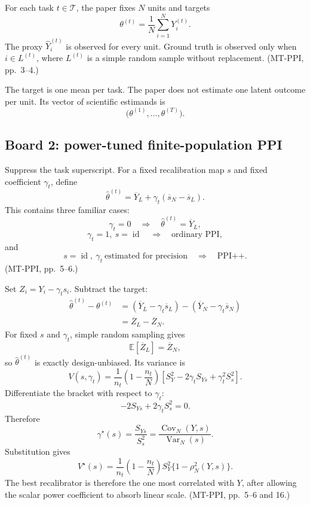 \documentclass[11pt]{article}
\newcommand{\E}{\mathbb{E}}
\newcommand{\Var}{\operatorname{Var}}
\newcommand{\Cov}{\operatorname{Cov}}
\begin{document}
  For each task \(t\in\mathcal T\), the paper fixes \(N\) units and targets
  \[
      \theta^{(t)}
      =
      \frac{1}{N}\sum_{i=1}^NY_i^{(t)}.
  \]
  The proxy \(\widehat Y_i^{(t)}\) is observed for every unit. Ground truth is
  observed only when \(i\in L^{(t)}\), where \(L^{(t)}\) is a simple random sample
  without replacement. (MT-PPI, pp.~3--4.)
  
  The target is one mean per task. The paper does not estimate one latent outcome
  per unit. Its vector of scientific estimands is
  \[
      \bigl(\theta^{(1)},\ldots,\theta^{(T)}\bigr).
  \]
  
  \subsection*{Board 2: power-tuned finite-population PPI}
  
  Suppress the task superscript. For a fixed recalibration map \(s\) and fixed
  coefficient \(\gamma_t\), define
  \[
      \widehat\theta^{(t)}
      =
      \overline Y_L+\gamma_t(\overline s_N-\overline s_L).
  \]
  This contains three familiar cases:
  \[
      \gamma_t=0
      \quad\Rightarrow\quad
      \widehat\theta^{(t)}=\overline Y_L,
  \]
  \[
      \gamma_t=1,\ s=\operatorname{id}
      \quad\Rightarrow\quad
      \text{ordinary PPI},
  \]
  and
  \[
      s=\operatorname{id},\ \gamma_t\ \text{estimated for precision}
      \quad\Rightarrow\quad
      \text{PPI++}.
  \]
  (MT-PPI, pp.~5--6.)
  
  Set \(Z_i=Y_i-\gamma_t s_i\). Subtract the target:
  \begin{align*}
      \widehat\theta^{(t)}-\theta^{(t)}
      &=
      (\overline Y_L-\gamma_t\overline s_L)
      -
      (\overline Y_N-\gamma_t\overline s_N)\\
      &=\overline Z_L-\overline Z_N.
  \end{align*}
  For fixed \(s\) and \(\gamma_t\), simple random sampling gives
  \[
      \E[\overline Z_L]=\overline Z_N,
  \]
  so \(\widehat\theta^{(t)}\) is exactly design-unbiased. Its variance is
  \[
      V(s,\gamma_t)
      =
      \frac{1}{n_t}
      \left(1-\frac{n_t}{N}\right)
      \left[
        S_Y^2-2\gamma_tS_{Ys}
        +\gamma_t^2S_s^2
      \right].
  \]
  Differentiate the bracket with respect to \(\gamma_t\):
  \[
      -2S_{Ys}+2\gamma_tS_s^2=0.
  \]
  Therefore
  \[
      \gamma^\star(s)
      =
      \frac{S_{Ys}}{S_s^2}
      =
      \frac{\Cov_N(Y,s)}{\Var_N(s)}.
  \]
  Substitution gives
  \[
      V^\star(s)
      =
      \frac{1}{n_t}\left(1-\frac{n_t}{N}\right)
      S_Y^2\{1-\rho_N^2(Y,s)\}.
  \]
  The best recalibrator is therefore the one most correlated with \(Y\), after
  allowing the scalar power coefficient to absorb linear scale. (MT-PPI,
  pp.~5--6 and 16.)
  
\end{document}
